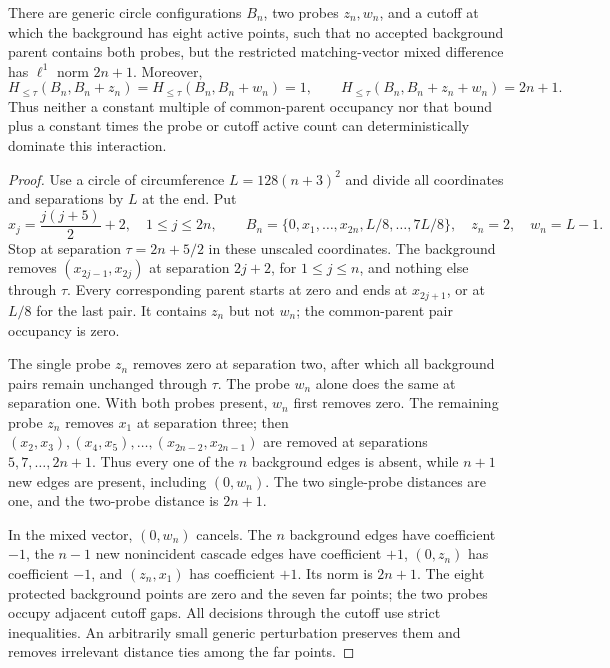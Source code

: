 \documentclass[11pt,letterpaper]{article}
\begin{document}
\begin{proposition}
\label{prop:common-parent-obstruction}
There are generic circle configurations $B_n$, two probes
$z_n,w_n$, and a cutoff at which the background has eight active
points, such that no accepted background parent contains both
probes, but the restricted matching-vector mixed difference has
$\ell^1$ norm $2n+1$. Moreover,
\[
 H_{\le\tau}(B_n,B_n+z_n)
   =H_{\le\tau}(B_n,B_n+w_n)=1,
 \qquad H_{\le\tau}(B_n,B_n+z_n+w_n)=2n+1.
\]
Thus neither a constant multiple of common-parent occupancy nor
that bound plus a constant times the probe or cutoff active
count can deterministically dominate this interaction.
\end{proposition}
\begin{proof}
Use a circle of circumference $L=128(n+3)^2$ and divide all
coordinates and separations by $L$ at the end. Put
\[
 x_j=\frac{j(j+5)}2+2,\quad 1\le j\le2n,
 \qquad B_n=\{0,x_1,\ldots,x_{2n},L/8,\ldots,7L/8\},
 \quad z_n=2,\quad w_n=L-1.
\]
Stop at separation $\tau=2n+5/2$ in these unscaled coordinates.
The background removes $(x_{2j-1},x_{2j})$ at separation
$2j+2$, for $1\le j\le n$, and nothing else through $\tau$.
Every corresponding parent starts at zero and ends at
$x_{2j+1}$, or at $L/8$ for the last pair. It contains $z_n$
but not $w_n$; the common-parent pair occupancy is zero.

The single probe $z_n$ removes zero at separation two, after
which all background pairs remain unchanged through $\tau$.
The probe $w_n$ alone does the same at separation one.
With both probes present, $w_n$ first removes zero. The remaining
probe $z_n$ removes $x_1$ at separation three; then
$(x_2,x_3),(x_4,x_5),\ldots,(x_{2n-2},x_{2n-1})$
are removed at separations $5,7,\ldots,2n+1$.
Thus every one of the $n$ background edges is absent, while
$n+1$ new edges are present, including $(0,w_n)$.
The two single-probe distances are one, and the two-probe
distance is $2n+1$.

In the mixed vector, $(0,w_n)$ cancels. The $n$ background
edges have coefficient $-1$, the $n-1$ new nonincident cascade
edges have coefficient $+1$, $(0,z_n)$ has coefficient $-1$,
and $(z_n,x_1)$ has coefficient $+1$. Its norm is $2n+1$.
The eight protected background points are zero and the seven
far points; the two probes occupy adjacent cutoff gaps.
All decisions through the cutoff use strict inequalities.
An arbitrarily small generic perturbation preserves them and
removes irrelevant distance ties among the far points.
\end{proof}
\end{document}
